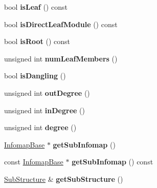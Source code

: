 \begin{DoxyCompactItemize}
\mbox{\label{classNodeBase_a2efc21d61a57ba170a6c64f919936ec2}} 
bool {\bfseries is\+Leaf} () const
\item 
\mbox{\label{classNodeBase_a9165b03301d5c5d52c16283ed54786c1}} 
bool {\bfseries is\+Direct\+Leaf\+Module} () const
\item 
\mbox{\label{classNodeBase_ac75ec5738b76fc60e7f0d36dae2c4f86}} 
bool {\bfseries is\+Root} () const
\item 
\mbox{\label{classNodeBase_a97545fedce380a70218f164122886228}} 
unsigned int {\bfseries num\+Leaf\+Members} ()
\item 
\mbox{\label{classNodeBase_abb7a407926d4c7ae18e3f0d92b94161f}} 
bool {\bfseries is\+Dangling} ()
\item 
\mbox{\label{classNodeBase_aebdb75f1d5622f85de5675f64ca4c99d}} 
unsigned int {\bfseries out\+Degree} ()
\item 
\mbox{\label{classNodeBase_a96f57fcec960e4ee9191a8c3cec5be0a}} 
unsigned int {\bfseries in\+Degree} ()
\item 
\mbox{\label{classNodeBase_ae191b7078781bf371c61bb86c6379fb9}} 
unsigned int {\bfseries degree} ()
\item 
\mbox{\label{classNodeBase_a8237976d2de69de70544a03ebff72cb3}} 
\mbox{\hyperlink{classInfomapBase}{Infomap\+Base}} $\ast$ {\bfseries get\+Sub\+Infomap} ()
\item 
\mbox{\label{classNodeBase_a004eed623043247a9b845777b27ab9ce}} 
const \mbox{\hyperlink{classInfomapBase}{Infomap\+Base}} $\ast$ {\bfseries get\+Sub\+Infomap} () const
\item 
\mbox{\label{classNodeBase_aba168c7ed5e129dc91d0ac154feb2a71}} 
\mbox{\hyperlink{structSubStructure}{Sub\+Structure}} \& {\bfseries get\+Sub\+Structure} ()
\item 
\mbox{\label{classNodeBase_ad9156fe7e98d8a18096f790cfac1c132}} 

\end{DoxyCompactItemize}
